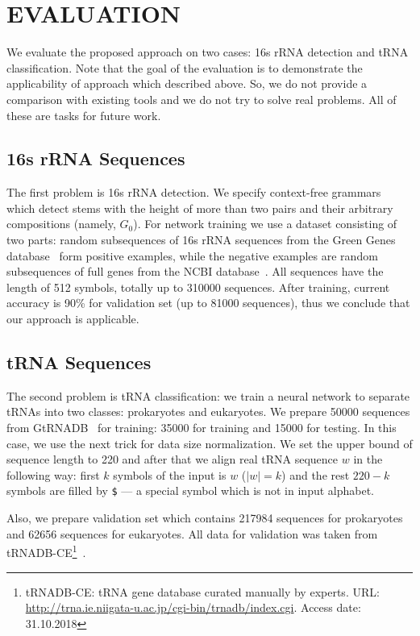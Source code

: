 \documentclass[a4paper,twoside]{article}
\begin{document}
\section{\uppercase{Evaluation}}
\label{sec:evaluation}

\noindent We evaluate the proposed approach on two cases: 16s rRNA detection and tRNA classification.
Note that the goal of the evaluation is to demonstrate the applicability of approach which described above.
So, we do not provide a comparison with existing tools and we do not try to solve real problems.
All of these are tasks for future work.

\subsection{16s rRNA Sequences}
\noindent The first problem is 16s rRNA detection.
We specify context-free grammars which detect stems with the height of more than two pairs and their arbitrary compositions (namely, $G_0$).
For network training we use a dataset consisting of two parts: random subsequences of 16s rRNA sequences from the Green Genes database~\cite{pmid16820507} form positive examples, while the negative examples are random subsequences of full genes from the NCBI database~\cite{pmid19854944}.
All sequences have the length of 512 symbols, totally up to 310000 sequences.
After training, current accuracy is 90\% for validation set (up to 81000 sequences), thus we conclude that our approach is applicable.

\subsection{tRNA Sequences}

\noindent The second problem is tRNA classification: we train a neural network to separate tRNAs into two classes: prokaryotes and eukaryotes.
We prepare 50000 sequences from GtRNADB~\cite{Chan2009} for training: 35000 for training and 15000 for testing.
In this case, we use the next trick for data size normalization.
We set the upper bound of sequence length to 220 and after that we align real tRNA sequence $w$ in the following way: first $k$ symbols of the input is $w$ ($|w|=k$) and the rest $220-k$ symbols are filled by \verb|$| --- a special symbol which is not in input alphabet.

Also, we prepare validation set which contains 217984 sequences for prokaryotes and 62656 sequences for eukaryotes.
All data for validation was taken from tRNADB-CE\footnote{tRNADB-CE: tRNA gene database curated manually by experts. URL: \url{http://trna.ie.niigata-u.ac.jp/cgi-bin/trnadb/index.cgi}. Access date: 31.10.2018}~\cite{Abe2010}.
\end{document}
